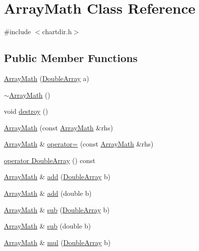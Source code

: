 \hypertarget{class_array_math}{}\section{Array\+Math Class Reference}
\label{class_array_math}


{\ttfamily \#include $<$chartdir.\+h$>$}

\subsection*{Public Member Functions}
\begin{DoxyCompactItemize}
\item 
\hyperlink{class_array_math_a3a8b5e89c10d1c1b2c098bf9dd4366d7}{Array\+Math} (\hyperlink{class_double_array}{Double\+Array} a)
\item 
\hyperlink{class_array_math_a65d4e3680182f61c866a61f375639245}{$\sim$\+Array\+Math} ()
\item 
void \hyperlink{class_array_math_a5c0ea92917740188c95e4e410eef2661}{destroy} ()
\item 
\hyperlink{class_array_math_a04ce35d72b715dc2f5889ff040872c1e}{Array\+Math} (const \hyperlink{class_array_math}{Array\+Math} \&rhs)
\item 
\hyperlink{class_array_math}{Array\+Math} \& \hyperlink{class_array_math_aefa81728a4b712db88e3e4453bf384ad}{operator=} (const \hyperlink{class_array_math}{Array\+Math} \&rhs)
\item 
\hyperlink{class_array_math_a1b309d87396b6971a40a71ea333b628d}{operator Double\+Array} () const
\item 
\hyperlink{class_array_math}{Array\+Math} \& \hyperlink{class_array_math_a0523eb1e6ea490c1a298a8b9bca05833}{add} (\hyperlink{class_double_array}{Double\+Array} b)
\item 
\hyperlink{class_array_math}{Array\+Math} \& \hyperlink{class_array_math_a3ebc72308c94fd2ea7dbf1407e8c9eeb}{add} (double b)
\item 
\hyperlink{class_array_math}{Array\+Math} \& \hyperlink{class_array_math_a67bc79157b230866a8ed1eb5e6179de0}{sub} (\hyperlink{class_double_array}{Double\+Array} b)
\item 
\hyperlink{class_array_math}{Array\+Math} \& \hyperlink{class_array_math_a4c05dccafd9c44167c2e158427ce3099}{sub} (double b)
\item 
\hyperlink{class_array_math}{Array\+Math} \& \hyperlink{class_array_math_a4fb34b6f319e7f3b2a5440d426832889}{mul} (\hyperlink{class_double_array}{Double\+Array} b)

\end{DoxyCompactItemize}
